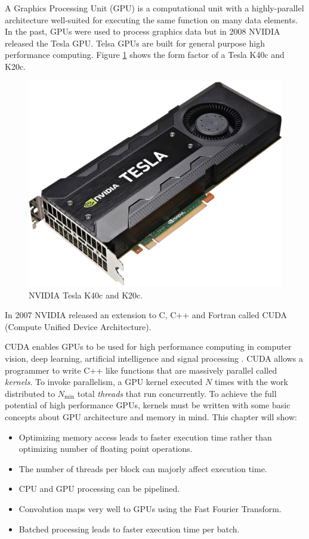 A Graphics Processing Unit (GPU) is a computational unit with a highly-parallel architecture well-suited for executing the same function on many data elements.
In the past, GPUs were used to process graphics data but in 2008 NVIDIA released the Tesla GPU.
Telsa GPUs are built for general purpose high performance computing.
Figure \ref{fig:GPUpicture} shows the form factor of a Tesla K40c and K20c.
\begin{figure}
	\centering\includegraphics[width=5in]{figures/gpu_intro/k40c_k20c.jpg}
	\caption{NVIDIA Tesla K40c and K20c.}
	\label{fig:GPUpicture}
\end{figure}
In 2007 NVIDIA released an extension to C, C++ and Fortran called CUDA (Compute Unified Device Architecture).

CUDA enables GPUs to be used for high performance computing in computer vision, deep learning, artificial intelligence and signal processing \cite{wikipedia-gpu:2015}.
CUDA allows a programmer to write C++ like functions that are massively parallel called \textit{kernels}.
To invoke parallelism, a GPU kernel executed $N$ times with the work distributed to $N_\text{min}$ total \textit{threads} that run concurrently.
To achieve the full potential of high performance GPUs, kernels must be written with some basic concepts about GPU architecture and memory in mind.
This chapter will show:
\begin{itemize}
\item Optimizing memory access leads to faster execution time rather than optimizing number of floating point operations.
\item The number of threads per block can majorly affect execution time.
\item CPU and GPU processing can be pipelined.
\item Convolution maps very well to GPUs using the Fast Fourier Transform.
\item Batched processing leads to faster execution time per batch.
\end{itemize}

